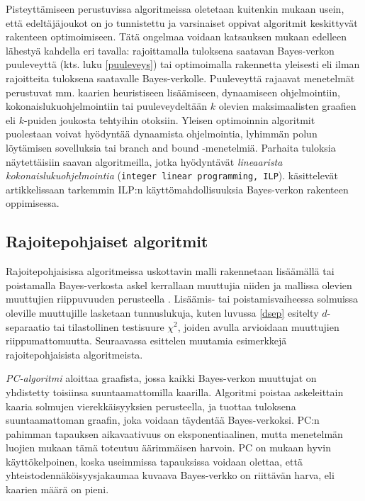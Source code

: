 Pisteyttämiseen perustuvissa algoritmeissa oletetaan kuitenkin \citet{scanagatta_survey_2019} mukaan usein, että edeltäjäjoukot on jo tunnistettu ja varsinaiset oppivat algoritmit keskittyvät rakenteen optimoimiseen. Tätä ongelmaa voidaan katsauksen mukaan edelleen lähestyä kahdella eri tavalla: rajoittamalla tuloksena saatavan Bayes-verkon puuleveyttä (kts. luku \ref{puuleveys}) tai optimoimalla rakennetta yleisesti eli ilman rajoitteita tuloksena saatavalle Bayes-verkolle. Puuleveyttä rajaavat menetelmät perustuvat mm. kaarien heuristiseen lisäämiseen, dynaamiseen ohjelmointiin, kokonaislukuohjelmointiin tai puuleveydeltään $k$ olevien maksimaalisten graafien eli $k$-puiden joukosta tehtyihin otoksiin. Yleisen optimoinnin algoritmit puolestaan voivat hyödyntää dynaamista ohjelmointia, lyhimmän polun löytämisen sovelluksia tai branch and bound -menetelmiä. Parhaita tuloksia näytettäisiin saavan algoritmeilla, jotka hyödyntävät \emph{lineaarista kokonaislukuohjelmointia} (\texttt{integer linear programming, ILP}). \citet{bartlett_integer_2017} käsittelevät artikkelissaan tarkemmin  ILP:n käyttömahdollisuuksia Bayes-verkon rakenteen oppimisessa. 

\subsection{Rajoitepohjaiset algoritmit} 

Rajoitepohjaisissa algoritmeissa uskottavin malli rakennetaan lisäämällä tai poistamalla Bayes-verkosta askel kerrallaan muuttujia niiden ja mallissa olevien muuttujien riippuvuuden perusteella \citep{ramsahai_connecting_2020, scutari_learning_2010}. Lisäämis- tai poistamisvaiheessa solmuissa oleville muuttujille lasketaan tunnuslukuja, kuten luvussa \ref{dsep} esitelty $d$-separaatio tai tilastollinen testisuure $\chi^2$, joiden avulla arvioidaan muuttujien riippumattomuutta. Seuraavassa esittelen muutamia esimerkkejä rajoitepohjaisista algoritmeista. 

\emph{PC-algoritmi} \citep{spirtes_causation_1993, tsagris_bayesian_2019} aloittaa graafista, jossa kaikki Bayes-verkon muuttujat on yhdistetty toisiinsa suuntaamattomilla kaarilla. Algoritmi poistaa askeleittain kaaria solmujen vierekkäisyyksien perusteella, ja tuottaa tuloksena suuntaamattoman graafin, joka voidaan täydentää Bayes-verkoksi. PC:n pahimman tapauksen aikavaativuus on eksponentiaalinen, mutta menetelmän luojien mukaan tämä toteutuu äärimmäisen harvoin. PC on \citet{scanagatta_survey_2019} mukaan hyvin käyttökelpoinen, koska useimmissa tapauksissa voidaan olettaa, että yhteistodennäköisyysjakaumaa kuvaava Bayes-verkko on riittävän harva, eli kaarien määrä on pieni. 

